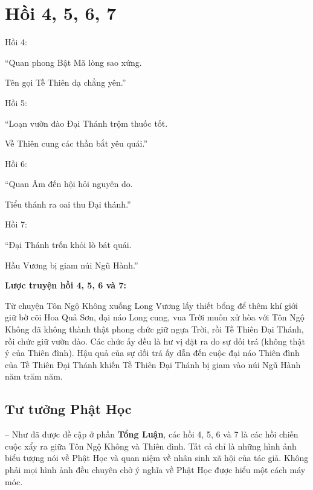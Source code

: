 \chapter{Hồi 4, 5, 6, 7} %
\label{cha:hoi_4_5_6_7}

Hồi 4:

\begin{itshape}
``Quan phong Bật Mã lòng sao xứng.

Tên gọi Tề Thiên dạ chẳng yên.''
\end{itshape}

Hồi 5:

\begin{itshape}
``Loạn vườn đào Đại Thánh trộm thuốc tốt.

Về Thiên cung các thần bắt yêu quái.''
\end{itshape}

Hồi 6:

\begin{itshape}
``Quan Âm đến hội hỏi nguyên do.

Tiểu thánh ra oai thu Đại thánh.''
\end{itshape}

Hồi 7:

\begin{itshape}
``Đại Thánh trốn khỏi lò bát quái.

Hầu Vương bị giam núi Ngũ Hành.''
\end{itshape}

{\bf Lược truyện hồi 4, 5, 6 và 7:}

Từ chuyện Tôn Ngộ Không xuống Long Vương lấy thiết bổng để thêm khí giới giữ bờ cõi Hoa Quả Sơn, đại náo Long cung, vua Trời muốn xử hòa với Tôn Ngộ Không đã không thành thật phong chức giữ ngựa Trời, rồi Tề Thiên Đại Thánh, rồi chức giữ vườn đào. Các chức ấy đều là hư vị đặt ra do sự dối trá (không thật ý của Thiên đình). Hậu quả của sự dối trá ấy dẫn đến cuộc đại náo Thiên đình của Tề Thiên Đại Thánh khiến Tề Thiên Đại Thánh bị giam vào núi Ngũ Hành năm trăm năm.

\section{Tư tưởng Phật Học} %
\label{sec:4_phat_hoc}

-- Như đã được đề cập ở phần {\bf Tổng Luận}, các hồi 4, 5, 6 và 7 là các hồi chiến cuộc xẩy ra giữa Tôn Ngộ Không và Thiên đình. Tất cả chỉ là những hình ảnh biểu tượng nói về Phật Học và quan niệm về nhân sinh xã hội của tác giả. Không phải mọi hình ảnh đều chuyên chở ý nghĩa về Phật Học được hiểu một cách máy móc.

